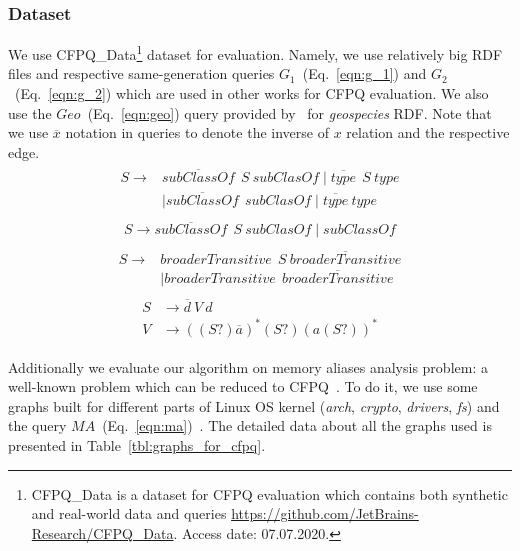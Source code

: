 \subsubsection{Dataset}

We use CFPQ\_Data\footnote{CFPQ\_Data is a dataset for CFPQ evaluation which contains both synthetic and real-world data and queries \url{https://github.com/JetBrains-Research/CFPQ\_Data}. Access date: 07.07.2020.} dataset for evaluation.
Namely, we use relatively big RDF files and respective same-generation queries $G_1$~(Eq.~\ref{eqn:g_1}) and $G_2$~(Eq.~\ref{eqn:g_2}) which are used in other works for CFPQ evaluation.
We also use the $Geo$~(Eq.~\ref{eqn:geo}) query provided by~\cite{Kuijpers:2019:ESC:3335783.3335791} for \textit{geospecies} RDF.
Note that we use $\overline{x}$ notation in queries to denote the inverse of $x$ relation and the respective edge.
\begin{align}
\begin{split}
\label{eqn:g_1}
S \to & \overline{\textit{subClassOf}} \ \ S \ \textit{subClasOf} \mid \overline{\textit{type}} \ \ S \ \textit{type}\\   & \mid \overline{\textit{subClassOf}} \ \ \textit{subClasOf} \mid \overline{\textit{type}} \ \textit{type}
\end{split}
\end{align}
\begin{align}
\begin{split}
\label{eqn:g_2}
S \to \overline{\textit{subClassOf}} \ \ S \ \textit{subClasOf} \mid \textit{subClassOf}
\end{split}
\end{align}
\begin{align}
\begin{split}
\label{eqn:geo}
S \to & \textit{broaderTransitive} \ \  S \ \overline{\textit{broaderTransitive}} \\
      & \mid \textit{broaderTransitive} \ \  \overline{\textit{broaderTransitive}}
\end{split}
\end{align}
\begin{align}
\begin{split}
\label{eqn:ma}
S & \to \overline{d} \ V \ d \\
V & \to ((S?) \overline{a})^* (S?) (a (S?))^*
\end{split}
\end{align}

Additionally we evaluate our algorithm on memory aliases analysis problem: a well-known problem which can be reduced to CFPQ~\citep{Zheng:2008:DAA:1328897.1328464}.
To do it, we use some graphs built for different parts of Linux OS kernel (\textit{arch}, \textit{crypto}, \textit{drivers}, \textit{fs}) and the query $MA$~(Eq.~\ref{eqn:ma})~\citep{10.1145/3093336.3037744}.
The detailed data about all the graphs used is presented in Table~\ref{tbl:graphs_for_cfpq}.

